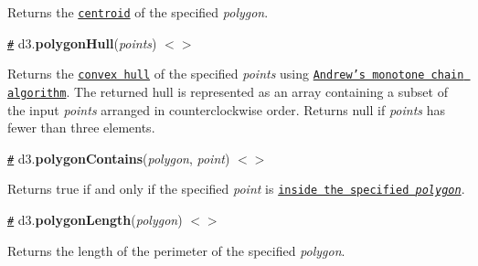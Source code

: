 Returns the \href{https://en.wikipedia.org/wiki/Centroid}{\tt centroid} of the specified {\itshape polygon}.

\href{#polygonHull}{\tt \#} d3.{\bfseries polygon\+Hull}({\itshape points}) \href{https://github.com/d3/d3-polygon/blob/master/src/hull.js#L23}{\tt $<$$>$}

\href{http://bl.ocks.org/mbostock/6f14f7b7f267a85f7cdc}{\tt }

Returns the \href{https://en.wikipedia.org/wiki/Convex_hull}{\tt convex hull} of the specified {\itshape points} using \href{http://en.wikibooks.org/wiki/Algorithm_Implementation/Geometry/Convex_hull/Monotone_chain}{\tt Andrew’s monotone chain algorithm}. The returned hull is represented as an array containing a subset of the input {\itshape points} arranged in counterclockwise order. Returns null if {\itshape points} has fewer than three elements.

\href{#polygonContains}{\tt \#} d3.{\bfseries polygon\+Contains}({\itshape polygon}, {\itshape point}) \href{https://github.com/d3/d3-polygon/blob/master/src/contains.js#L1}{\tt $<$$>$}

Returns true if and only if the specified {\itshape point} is \href{https://www.ecse.rpi.edu/Homepages/wrf/Research/Short_Notes/pnpoly.html}{\tt inside the specified {\itshape polygon}}.

\href{#polygonLength}{\tt \#} d3.{\bfseries polygon\+Length}({\itshape polygon}) \href{https://github.com/d3/d3-polygon/blob/master/src/length.js#L1}{\tt $<$$>$}

Returns the length of the perimeter of the specified {\itshape polygon}. 